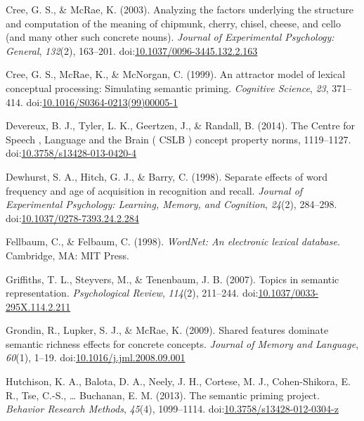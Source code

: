 \documentclass[english,,man]{apa6}
\theoremstyle{definition}
\theoremstyle{definition}
\theoremstyle{definition}
\theoremstyle{remark}
\begin{document}
\leavevmode\hypertarget{ref-Cree2003}{}%
Cree, G. S., \& McRae, K. (2003). Analyzing the factors underlying the
structure and computation of the meaning of chipmunk, cherry, chisel,
cheese, and cello (and many other such concrete nouns). \emph{Journal of
Experimental Psychology: General}, \emph{132}(2), 163--201.
doi:\href{https://doi.org/10.1037/0096-3445.132.2.163}{10.1037/0096-3445.132.2.163}

\leavevmode\hypertarget{ref-Cree1999}{}%
Cree, G. S., McRae, K., \& McNorgan, C. (1999). An attractor model of
lexical conceptual processing: Simulating semantic priming.
\emph{Cognitive Science}, \emph{23}, 371--414.
doi:\href{https://doi.org/10.1016/S0364-0213(99)00005-1}{10.1016/S0364-0213(99)00005-1}

\leavevmode\hypertarget{ref-Devereux2014}{}%
Devereux, B. J., Tyler, L. K., Geertzen, J., \& Randall, B. (2014). The
Centre for Speech , Language and the Brain ( CSLB ) concept property
norms, 1119--1127.
doi:\href{https://doi.org/10.3758/s13428-013-0420-4}{10.3758/s13428-013-0420-4}

\leavevmode\hypertarget{ref-Dewhurst1998}{}%
Dewhurst, S. A., Hitch, G. J., \& Barry, C. (1998). Separate effects of
word frequency and age of acquisition in recognition and recall.
\emph{Journal of Experimental Psychology: Learning, Memory, and
Cognition}, \emph{24}(2), 284--298.
doi:\href{https://doi.org/10.1037/0278-7393.24.2.284}{10.1037/0278-7393.24.2.284}

\leavevmode\hypertarget{ref-Felbaum1998}{}%
Fellbaum, C., \& Felbaum, C. (1998). \emph{WordNet: An electronic
lexical database}. Cambridge, MA: MIT Press.

\leavevmode\hypertarget{ref-Griffiths2007}{}%
Griffiths, T. L., Steyvers, M., \& Tenenbaum, J. B. (2007). Topics in
semantic representation. \emph{Psychological Review}, \emph{114}(2),
211--244.
doi:\href{https://doi.org/10.1037/0033-295X.114.2.211}{10.1037/0033-295X.114.2.211}

\leavevmode\hypertarget{ref-Grondin2009}{}%
Grondin, R., Lupker, S. J., \& McRae, K. (2009). Shared features
dominate semantic richness effects for concrete concepts. \emph{Journal
of Memory and Language}, \emph{60}(1), 1--19.
doi:\href{https://doi.org/10.1016/j.jml.2008.09.001}{10.1016/j.jml.2008.09.001}

\leavevmode\hypertarget{ref-Hutchison2013}{}%
Hutchison, K. A., Balota, D. A., Neely, J. H., Cortese, M. J.,
Cohen-Shikora, E. R., Tse, C.-S., \ldots{} Buchanan, E. M. (2013). The
semantic priming project. \emph{Behavior Research Methods},
\emph{45}(4), 1099--1114.
doi:\href{https://doi.org/10.3758/s13428-012-0304-z}{10.3758/s13428-012-0304-z}
\end{document}
